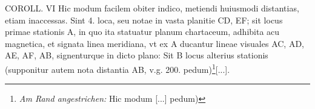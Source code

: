  \pend \vspace{3.0ex} \pstart \centering [p.~13] COROLL. VI  \pend \vspace{1.0ex} \pstart Hic modum facilem obiter indico, metiendi huiusmodi distantias, etiam inaccessas. Sint 4. loca, seu notae in  vasta planitie CD, EF; sit locus primae stationis A, in  quo ita statuatur planum chartaceum, adhibita acu\protect{} magnetica, et signata linea meridiana, vt ex A ducantur  lineae visuales AC, AD, AE, AF, AB, sig\-nenturque  in dicto plano: Sit B locus alterius stationis (supponitur  autem nota distantia AB, v.g. 200. pedum)\footnote{\textit{Am Rand angestrichen:} Hic modum [...] pedum) }[...].